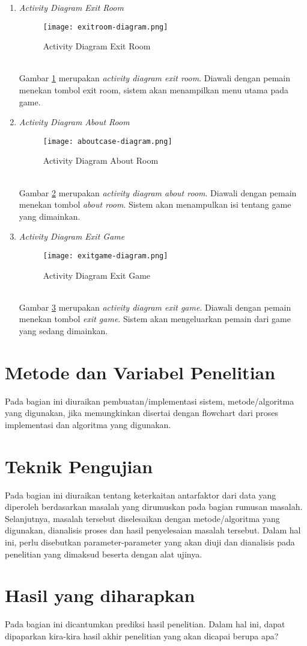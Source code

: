 \begin{enumerate}
    \newpage
    \item  \textit{Activity Diagram Exit Room}
    \begin{figure}[h]
        \centering
        \texttt{[image: exitroom-diagram.png]}
        \caption{Activity Diagram Exit Room}
        \label{fig:eroom-case}
    \end{figure}
    \\ Gambar \ref{fig:eroom-case} merupakan \textit{activity diagram exit room}. Diawali dengan pemain menekan tombol exit room, sistem akan menampilkan menu utama pada game.
    \item \textit{Activity Diagram About Room}
     \begin{figure}[h]
        \centering
        \texttt{[image: aboutcase-diagram.png]}
        \caption{Activity Diagram About Room}
        \label{fig:aroom-case}
    \end{figure}
    \\ Gambar \ref{fig:aroom-case} merupakan \textit{activity diagram about room}. Diawali dengan pemain menekan tombol \textit{about room}. Sistem akan menampulkan isi tentang game yang dimainkan.
    \item  \textit{Activity Diagram Exit Game}
    \begin{figure}[h]
        \centering
        \texttt{[image: exitgame-diagram.png]}
        \caption{Activity Diagram Exit Game}
        \label{fig:egame-case}
    \end{figure}
    \\ Gambar \ref{fig:egame-case} merupakan \textit{activity diagram exit game}. Diawali dengan pemain menekan tombol \textit{exit game}. Sistem akan mengeluarkan pemain dari game yang sedang dimainkan.
\end{enumerate}
\section{Metode dan Variabel Penelitian}
        Pada bagian ini diuraikan pembuatan/implementasi sistem,   metode/algoritma yang digunakan, jika memungkinkan disertai dengan flowchart dari proses implementasi dan algoritma yang digunakan.
        
\section{Teknik Pengujian}
        Pada bagian ini diuraikan tentang keterkaitan antarfaktor dari data yang diperoleh  berdasarkan masalah yang dirumuskan pada bagian rumusan masalah. Selanjutnya,  masalah tersebut diselesaikan dengan metode/algoritma yang digunakan, dianalisis proses dan hasil penyelesaian masalah tersebut.  Dalam hal ini, perlu disebutkan parameter-parameter yang akan diuji dan dianalisis pada penelitian yang dimaksud beserta dengan alat ujinya.
        
\section{Hasil yang diharapkan}
        Pada bagian ini dicantumkan prediksi hasil penelitian. Dalam hal ini, dapat dipaparkan kira-kira hasil akhir penelitian yang akan dicapai berupa apa?